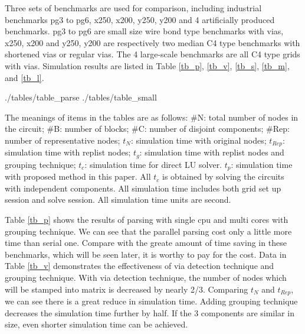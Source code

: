 \documentclass{sig-alternate}
\begin{document}
	Three sets of benchmarks are used for comparison, including 
	industrial benchmarks pg3 to pg6, x250, x200, y250, y200 and 4 artificially produced benchmarks. pg3 to pg6 are 
	small size wire bond type benchmarks with vias, x250, x200 and y250, y200 are respectively two median C4 type benchmarks with
	shortened vias or regular vias. The 4 large-scale benchmarks are all C4 type grids with vias. Simulation results are 
	listed in Table \ref{tb_p}, \ref{tb_v}, \ref{tb_s}, \ref{tb_m}, and \ref{tb_l}.
	\begin{table}[h]
	   {./tables/table_parse} \label{tb_p}
	   \label{tb_v}
  	   {./tables/table_small} \label{tb_s}
	\end{table}
	\begin{table}[h]
  	   \label{tb_m}
  	   \label{tb_l}
	\end{table}

	The meanings of items in the tables are as follows: \#N: total number of nodes in the circuit; 
	\#B: number of blocks; \#C: number of disjoint components; \#Rep: number of representative nodes; 
  	$t_N$: simulation time with original nodes; $t_{Rep}$: simulation time with replist nodes; 
	$t_g$: simulation time with replist nodes and grouping technique; $t_c$: simulation time for direct LU solver. 
	$t_p$: simulation time with proposed method in this paper.  
	All $t_c$ is obtained by solving the circuits with independent components. All 
	simulation time includes both grid set up session and solve session. All simulation time units are second.

	Table \ref{tb_p} shows the results of parsing with single cpu and multi cores with grouping technique. We can see that the
	parallel parsing cost only a little more time than serial one. Compare with the greate amount of time saving in these benchmarks,
	which will be seen later, it is worthy to pay for the cost. 
	Data in Table \ref{tb_v} demonstrates the effectiveness of via detection technique and grouping technique. With via detection 
	technique, the 
	number of nodes which will be stamped into matrix is decreased by nearly 2/3. Comparing $t_N$ and $t_{Rep}$, we can see there is a
	great reduce in simulation time. Adding grouping technique decreases the simulation time further by half. If the 3 components are 
	similar in size, even shorter simulation time can be achieved.
\end{document}
